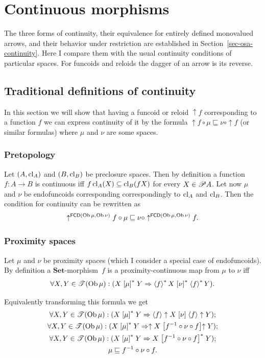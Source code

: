 
\chapter{Continuous morphisms}

The three forms of continuity, their equivalence for entirely defined
monovalued arrows, and their behavior under restriction are established
in Section~\ref{sec-osa-continuity}. Here I compare them with the
usual continuity conditions of particular spaces. For funcoids and
reloids the dagger of an arrow is its reverse.

\section{Traditional definitions of continuity}

In this section we will show that having a funcoid or reloid $\uparrow f$
corresponding to a function $f$ we can express continuity of it by
the formula $\uparrow f\circ\mu\sqsubseteq\nu\circ\uparrow f$ (or
similar formulas) where $\mu$ and $\nu$ are some spaces.


\subsection{Pretopology}

Let $(A,\operatorname{cl}_{A})$ and $(B,\operatorname{cl}_{B})$ be preclosure spaces. Then by
definition a function $f:A\rightarrow B$ is continuous iff $f\operatorname{cl}_{A}(X)\subseteq\operatorname{cl}_{B}(fX)$
for every $X\in\mathscr{P} A$. Let now $\mu$ and $\nu$ be endofuncoids
corresponding correspondingly to $\operatorname{cl}_{A}$ and $\operatorname{cl}_{B}$. Then the
condition for continuity can be rewritten as
\[
\uparrow^{\mathsf{FCD}(\operatorname{Ob}\mu,\operatorname{Ob}\nu)}f\circ\mu\sqsubseteq\nu\circ\uparrow^{\mathsf{FCD}(\operatorname{Ob}\mu,\operatorname{Ob}\nu)}f.
\]



\subsection{Proximity spaces}

Let $\mu$ and $\nu$ be proximity spaces (which I consider a special
case of endofuncoids). By definition a $\mathbf{Set}$-morphism~$f$
is a proximity-continuous map from $\mu$
to $\nu$ iff
\[
\forall X,Y\in\mathscr{T}(\operatorname{Ob}\mu):(X\mathrel{\left[\mu\right]^{\ast}}Y\Rightarrow\left\langle f\right\rangle ^{\ast}X\mathrel{\left[\nu\right]^{\ast}}\left\langle f\right\rangle ^{\ast}Y).
\]


Equivalently transforming this formula we get
\begin{gather*}
\forall X,Y\in\mathscr{T}(\operatorname{Ob}\mu):(X\mathrel{\left[\mu\right]^{\ast}}Y\Rightarrow\left\langle f\right\rangle\uparrow X\mathrel{\left[\nu\right]}\left\langle f\right\rangle\uparrow Y);\\
\forall X,Y\in\mathscr{T}(\operatorname{Ob}\mu):(X\mathrel{\left[\mu\right]^{\ast}}Y\Rightarrow\uparrow X\mathrel{\left[f^{-1}\circ\nu\circ f\right]}\uparrow Y);\\
\forall X,Y\in\mathscr{T}(\operatorname{Ob}\mu):(X\mathrel{\left[\mu\right]^{\ast}}Y\Rightarrow X\mathrel{\left[f^{-1}\circ\nu\circ f\right]^{\ast}}Y);\\
\mu\sqsubseteq f^{-1}\circ\nu\circ f.
\end{gather*}


